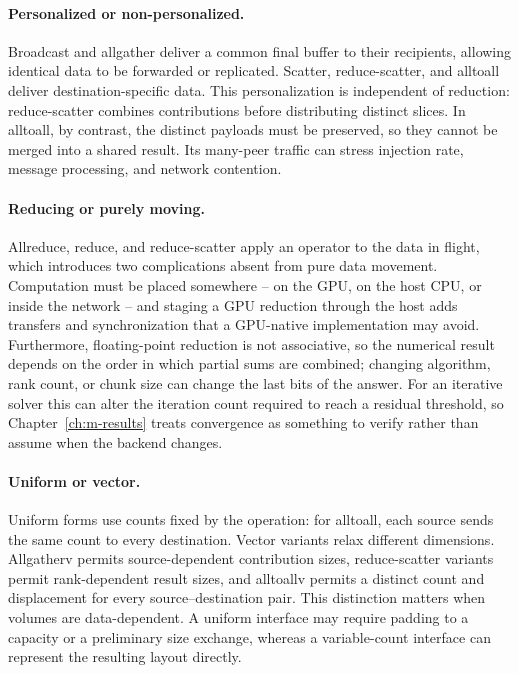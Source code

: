 \paragraph{Personalized or non-personalized.} Broadcast and allgather deliver a common final buffer to their recipients, allowing identical data to be forwarded or replicated. Scatter, reduce-scatter, and alltoall deliver destination-specific data. This personalization is independent of reduction: reduce-scatter combines contributions before distributing distinct slices. In alltoall, by contrast, the distinct payloads must be preserved, so they cannot be merged into a shared result. Its many-peer traffic can stress injection rate, message processing, and network contention.

\paragraph{Reducing or purely moving.} Allreduce, reduce, and reduce-scatter apply an operator to the data in flight, which introduces two complications absent from pure data movement. Computation must be placed somewhere -- on the GPU, on the host CPU, or inside the network -- and staging a GPU reduction through the host adds transfers and synchronization that a GPU-native implementation may avoid. Furthermore, floating-point reduction is not associative, so the numerical result depends on the order in which partial sums are combined; changing algorithm, rank count, or chunk size can change the last bits of the answer. For an iterative solver this can alter the iteration count required to reach a residual threshold, so Chapter~\ref{ch:m-results} treats convergence as something to verify rather than assume when the backend changes.

\paragraph{Uniform or vector.} Uniform forms use counts fixed by the operation: for alltoall, each source sends the same count to every destination. Vector variants relax different dimensions. Allgatherv permits source-dependent contribution sizes, reduce-scatter variants permit rank-dependent result sizes, and alltoallv permits a distinct count and displacement for every source--destination pair. This distinction matters when volumes are data-dependent. A uniform interface may require padding to a capacity or a preliminary size exchange, whereas a variable-count interface can represent the resulting layout directly.

